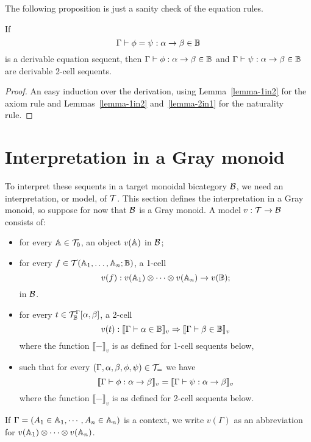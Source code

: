 \documentclass{robinthesisdraft}
\begin{document}
The following proposition is just a sanity check of the equation rules.
\begin{propn}
	If \[\Gamma\vdash\phi=\psi: \alpha\to\beta\in\mathbb{B}\] is a derivable equation
	sequent, then $\Gamma\vdash\phi: \alpha\to\beta\in\mathbb{B}$
	and $\Gamma\vdash\psi: \alpha\to\beta\in\mathbb{B}$
	are derivable 2-cell sequents.
\end{propn}
\begin{proof}
	An easy induction over the derivation, using
	Lemma~\ref{lemma-1in2} for the axiom rule and
	Lemmas~\ref{lemma-1in2} and~\ref{lemma-2in1} for the naturality rule.
\end{proof}

\section{Interpretation in a Gray monoid}
To interpret these sequents in a target monoidal bicategory $\mathcal{B}$, we need
an interpretation, or model, of ${\mathcal{T}}$. This section defines the interpretation
in a Gray monoid, so suppose for now that $\mathcal{B}$ is a Gray monoid.
A model $v:{\mathcal{T}}\to\mathcal{B}$ consists of:
\begin{itemize}
	\item for every $\mathbb{A}\in{\mathcal{T}}_{0}$, an object $v(\mathbb{A})$ in $\mathcal{B}$;
	\item for every $f\in{\mathcal{T}}(\mathbb{A}_{1},\dots,\mathbb{A}_{n};\mathbb{B})$, a 1-cell
	\[
		v(f): v(\A_{1})\tn\cdots\tn v(\A_{n})\to v(\CB);
	\]
	in $\mathcal{B}$.
	\item for every $t\in{\mathcal{T}}^{\Gamma}_{\mathbb{B}}[\alpha, \beta]$, a 2-cell
	\[
		v(t): \llbracket \Gamma\vdash\alpha\in\mathbb{B} \rrbracket_{v} \Rightarrow
			\llbracket \Gamma\vdash\beta\in\mathbb{B} \rrbracket_{v}
	\]
	where the function $\llbracket-\rrbracket_{v}$ is as defined for 1-cell
	sequents below,
	\item such that for every $(\Gamma,\alpha,\beta,\phi,\psi)\in{\mathcal{T}}_{=}$
	we have
	\[
		\llbracket \Gamma\vdash\phi:\alpha\to\beta \rrbracket_{v}
		=
		\llbracket \Gamma\vdash\psi:\alpha\to\beta \rrbracket_{v}
	\]
	where the function $\llbracket-\rrbracket_{v}$ is as defined for 2-cell
	sequents below.
\end{itemize}
If $\Gamma = (A_{1}\in\mathbb{A}_{1}, \cdots, A_{n}\in\mathbb{A}_{n})$ is a context, we write
$v(\Gamma)$ as an abbreviation for $v(\A_{1})\tn\cdots\tn v(\A_{n})$.
%
\end{document}
